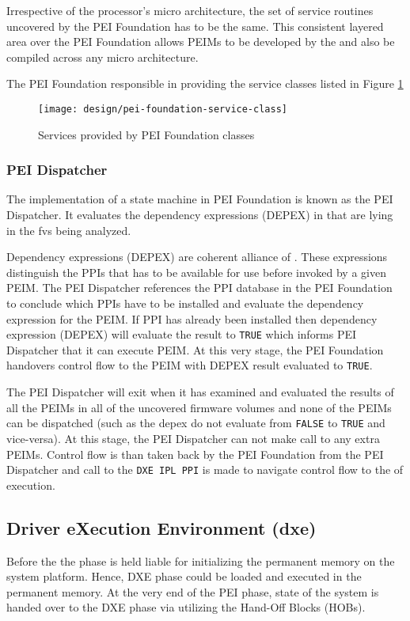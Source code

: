 Irrespective of the processor's micro architecture, the set of service routines uncovered by the PEI Foundation has to be the same. This consistent layered area over the PEI Foundation allows PEIMs to be developed by the  and also be compiled across any micro architecture.

The PEI Foundation responsible in providing the service classes listed in Figure \ref{fig:pei-foundation-service-class}
\begin{figure}[!htbp]
	\centering
	\texttt{[image: design/pei-foundation-service-class]}
	\caption{Services provided by PEI Foundation classes}\label{fig:pei-foundation-service-class}
\end{figure}

\subsubsection{PEI Dispatcher}
The implementation of a state machine in PEI Foundation is known as the PEI Dispatcher. It evaluates the dependency expressions (DEPEX) in  that are lying in the \gls{fv}s being analyzed.

Dependency expressions (DEPEX) are coherent alliance of . These expressions distinguish the PPIs that has to be available for use before invoked by a given PEIM. The PEI Dispatcher references the PPI database in the PEI Foundation to conclude which PPIs have to be installed and evaluate the dependency expression for the PEIM. If PPI has already been installed then dependency expression (DEPEX) will evaluate the result to \verb|TRUE| which informs PEI Dispatcher that it can execute PEIM. At this very stage, the PEI Foundation handovers control flow to the PEIM with DEPEX result evaluated to \verb|TRUE|. 

The PEI Dispatcher will exit when it has examined and evaluated the results of all the PEIMs in all of the uncovered firmware volumes and none of the PEIMs can be dispatched (such as the \gls{depex} do not evaluate from \verb|FALSE| to \verb|TRUE| and vice-versa). At this stage, the PEI Dispatcher can not make call to any extra PEIMs. Control flow is than taken back by the PEI Foundation from the PEI Dispatcher and call to the \verb|DXE IPL PPI| is made to navigate control flow to the  of execution.

\subsection{Driver eXecution Environment (\gls{dxe})}
Before the  the  phase is held liable for initializing the permanent memory on the system platform. Hence, DXE phase could be loaded and executed in the permanent memory. At the very end of the PEI phase, state of the system is handed over to the DXE phase via utilizing the Hand-Off Blocks (HOBs). 

